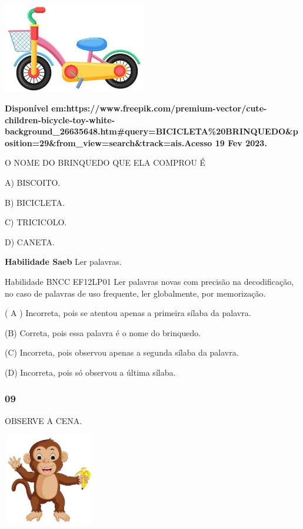 \begin{escola}
\includegraphics[width=2.45625in,height=1.54583in]{media/image217.jpg}

\textbf{Disponível
em:https://www.freepik.com/premium-vector/cute-children-bicycle-toy-white-background\_26635648.htm\#query=BICICLETA\%20BRINQUEDO\&position=29\&from\_view=search\&track=ais.Acesso
19 Fev 2023.}

O NOME DO BRINQUEDO QUE ELA COMPROU É

A) BISCOITO.

B) BICICLETA.

C) TRICICOLO.

D) CANETA.

\textbf{Habilidade Saeb} Ler palavras.

Habilidade BNCC EF12LP01 Ler palavras novas com precisão na
decodificação, no caso de palavras de uso frequente, ler globalmente,
por memorização.

\protect\hypertarget{_heading=h.3tbugp1}{}{}( A ) Incorreta, pois se
atentou apenas a primeira sílaba da palavra.

(B) Correta, pois essa palavra é o nome do brinquedo.

(C) Incorreta, pois observou apenas a segunda sílaba da palavra.

(D) Incorreta, pois só observou a última sílaba.

\subsubsection{09}\label{section-49}

OBSERVE A CENA.

\includegraphics[width=1.57569in,height=1.57569in]{media/image218.jpg}


\end{escola}
